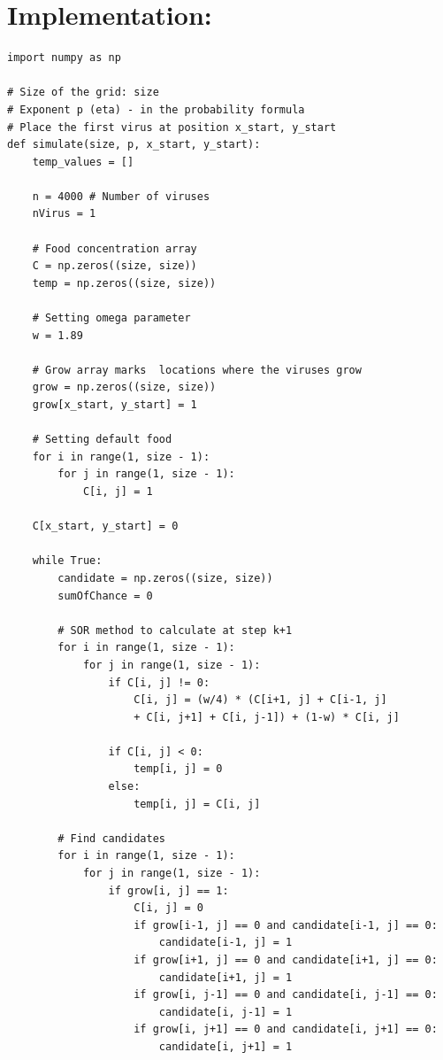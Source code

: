 \documentclass[a4paper,10pt,notitlepage]{article}
\begin{document}
{{{\newpage
\section{\textbf{Implementation: }}
{\setlength{\parskip}{0.5cm}
\vspace{1.5cm}
\begin{lstlisting}
import numpy as np

# Size of the grid: size
# Exponent p (eta) - in the probability formula
# Place the first virus at position x_start, y_start
def simulate(size, p, x_start, y_start):
    temp_values = []

    n = 4000 # Number of viruses
    nVirus = 1

    # Food concentration array
    C = np.zeros((size, size))
    temp = np.zeros((size, size))

    # Setting omega parameter
    w = 1.89

    # Grow array marks  locations where the viruses grow
    grow = np.zeros((size, size))
    grow[x_start, y_start] = 1

    # Setting default food
    for i in range(1, size - 1):
        for j in range(1, size - 1):
            C[i, j] = 1

    C[x_start, y_start] = 0

    while True:
        candidate = np.zeros((size, size))
        sumOfChance = 0
                
        # SOR method to calculate at step k+1
        for i in range(1, size - 1):
            for j in range(1, size - 1):
                if C[i, j] != 0:
                    C[i, j] = (w/4) * (C[i+1, j] + C[i-1, j] 
                    + C[i, j+1] + C[i, j-1]) + (1-w) * C[i, j]

                if C[i, j] < 0:
                    temp[i, j] = 0
                else:
                    temp[i, j] = C[i, j]

        # Find candidates
        for i in range(1, size - 1): 
            for j in range(1, size - 1):
                if grow[i, j] == 1:
                    C[i, j] = 0
                    if grow[i-1, j] == 0 and candidate[i-1, j] == 0:
                        candidate[i-1, j] = 1
                    if grow[i+1, j] == 0 and candidate[i+1, j] == 0:
                        candidate[i+1, j] = 1
                    if grow[i, j-1] == 0 and candidate[i, j-1] == 0:
                        candidate[i, j-1] = 1
                    if grow[i, j+1] == 0 and candidate[i, j+1] == 0:
                        candidate[i, j+1] = 1


\end{lstlisting}}}}}
\end{document}
